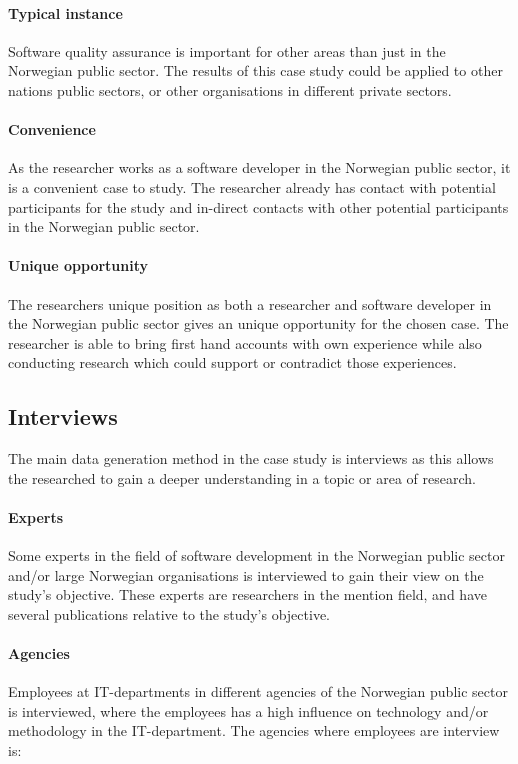 \paragraph{Typical instance}
Software quality assurance is important for other areas than just in the Norwegian public sector. The results of this case study could be applied to other nations public sectors, or other organisations in different private sectors.

\paragraph{Convenience}
As the researcher works as a software developer in the Norwegian public sector, it is a convenient case to study. The researcher already has contact with potential participants for the study and in-direct contacts with other potential participants in the Norwegian public sector.

\paragraph{Unique opportunity}
The researchers unique position as both a researcher and software developer in the Norwegian public sector gives an unique opportunity for the chosen case. The researcher is able to bring first hand accounts with own experience while also conducting research which could support or contradict those experiences.

\subsection{Interviews}
The main data generation method in the case study is interviews as this allows the researched to gain a deeper understanding in a topic or area of research.


\paragraph{Experts}
Some experts in the field of software development in the Norwegian public sector and/or large Norwegian organisations is interviewed to gain their view on the study's objective. These experts are researchers in the mention field, and have several publications relative to the study's objective.

\paragraph{Agencies}
Employees at IT-departments in different agencies of the Norwegian public sector is interviewed, where the employees has a high influence on technology and/or methodology in the IT-department. The agencies where employees are interview is:


